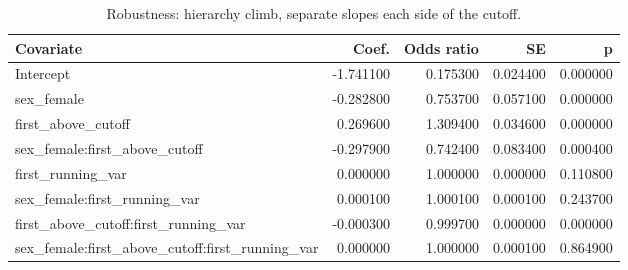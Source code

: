 \begin{table}[htbp]
\centering
\begin{tabular}{lrrrr}
\toprule
Covariate & Coef. & Odds ratio & SE & p \\
\midrule
Intercept & -1.741100 & 0.175300 & 0.024400 & 0.000000 \\
sex_female & -0.282800 & 0.753700 & 0.057100 & 0.000000 \\
first_above_cutoff & 0.269600 & 1.309400 & 0.034600 & 0.000000 \\
sex_female:first_above_cutoff & -0.297900 & 0.742400 & 0.083400 & 0.000400 \\
first_running_var & 0.000000 & 1.000000 & 0.000000 & 0.110800 \\
sex_female:first_running_var & 0.000100 & 1.000100 & 0.000100 & 0.243700 \\
first_above_cutoff:first_running_var & -0.000300 & 0.999700 & 0.000000 & 0.000000 \\
sex_female:first_above_cutoff:first_running_var & 0.000000 & 1.000000 & 0.000100 & 0.864900 \\
\bottomrule
\end{tabular}

\caption{Robustness: hierarchy climb, separate slopes each side of the cutoff.}
\label{tab:climb_flexible}
\end{table}
